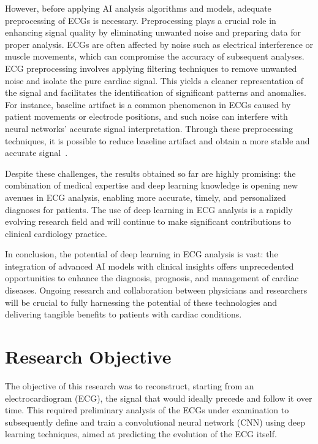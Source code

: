 \documentclass[12pt,english]{report}
\begin{document}
However, before applying AI analysis algorithms and models, adequate preprocessing of ECGs is necessary. Preprocessing plays a crucial role in enhancing signal quality by eliminating unwanted noise and preparing data for proper analysis. ECGs are often affected by noise such as electrical interference or muscle movements, which can compromise the accuracy of subsequent analyses. ECG preprocessing involves applying filtering techniques to remove unwanted noise and isolate the pure cardiac signal. This yields a cleaner representation of the signal and facilitates the identification of significant patterns and anomalies. For instance, baseline artifact is a common phenomenon in ECGs caused by patient movements or electrode positions, and such noise can interfere with neural networks' accurate signal interpretation. Through these preprocessing techniques, it is possible to reduce baseline artifact and obtain a more stable and accurate signal~\cite{use}.

Despite these challenges, the results obtained so far are highly promising: the combination of medical expertise and deep learning knowledge is opening new avenues in ECG analysis, enabling more accurate, timely, and personalized diagnoses for patients. The use of deep learning in ECG analysis is a rapidly evolving research field and will continue to make significant contributions to clinical cardiology practice.

In conclusion, the potential of deep learning in ECG analysis is vast: the integration of advanced AI models with clinical insights offers unprecedented opportunities to enhance the diagnosis, prognosis, and management of cardiac diseases. Ongoing research and collaboration between physicians and researchers will be crucial to fully harnessing the potential of these technologies and delivering tangible benefits to patients with cardiac conditions.

\section{Research Objective}
\label{sec:objective}

The objective of this research was to reconstruct, starting from an electrocardiogram (ECG), the signal that would ideally precede and follow it over time. This required preliminary analysis of the ECGs under examination to subsequently define and train a convolutional neural network (CNN) using deep learning techniques, aimed at predicting the evolution of the ECG itself.
\end{document}
